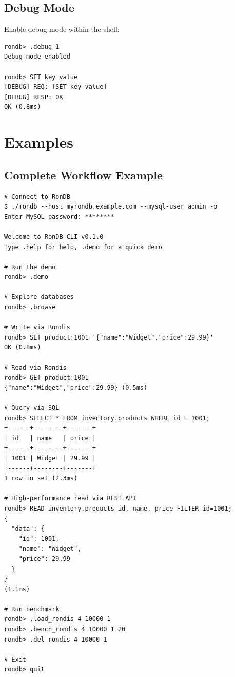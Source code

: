\documentclass[11pt,a4paper]{report}
\begin{document}
\section{Debug Mode}

Enable debug mode within the shell:

\begin{lstlisting}[language=rondb]
rondb> .debug 1
Debug mode enabled

rondb> SET key value
[DEBUG] REQ: [SET key value]
[DEBUG] RESP: OK
OK (0.8ms)
\end{lstlisting}

\chapter{Examples}

\section{Complete Workflow Example}

\begin{lstlisting}[language=rondb]
# Connect to RonDB
$ ./rondb --host myrondb.example.com --mysql-user admin -p
Enter MySQL password: ********

Welcome to RonDB CLI v0.1.0
Type .help for help, .demo for a quick demo

# Run the demo
rondb> .demo

# Explore databases
rondb> .browse

# Write via Rondis
rondb> SET product:1001 '{"name":"Widget","price":29.99}'
OK (0.8ms)

# Read via Rondis
rondb> GET product:1001
{"name":"Widget","price":29.99} (0.5ms)

# Query via SQL
rondb> SELECT * FROM inventory.products WHERE id = 1001;
+------+--------+-------+
| id   | name   | price |
+------+--------+-------+
| 1001 | Widget | 29.99 |
+------+--------+-------+
1 row in set (2.3ms)

# High-performance read via REST API
rondb> READ inventory.products id, name, price FILTER id=1001;
{
  "data": {
    "id": 1001,
    "name": "Widget",
    "price": 29.99
  }
}
(1.1ms)

# Run benchmark
rondb> .load_rondis 4 10000 1
rondb> .bench_rondis 4 10000 1 20
rondb> .del_rondis 4 10000 1

# Exit
rondb> quit
\end{lstlisting}
\end{document}
